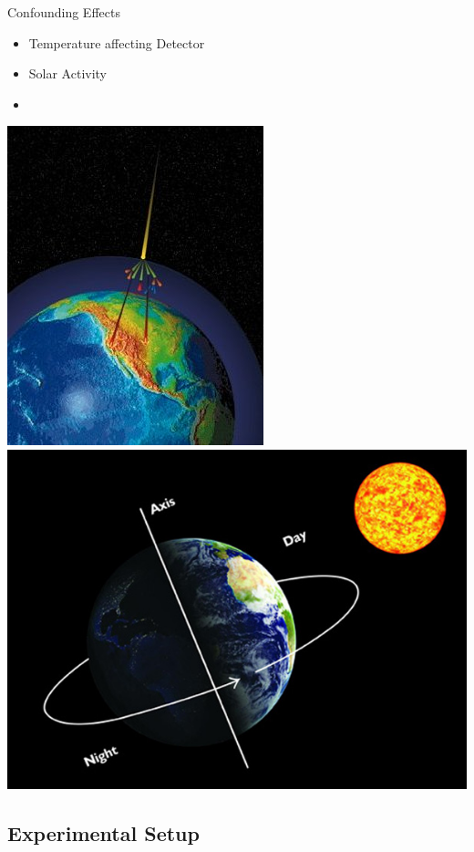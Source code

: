 \documentclass{beamer}
\begin{document}
\begin{frame}{Confounding Effects}
\begin{itemize}
	\item Temperature affecting Detector
	\item Solar Activity
	\item 
\end{itemize}
\centering
\includegraphics[scale=.4]{../Figures/crhitsearth.jpg}
\hspace{20pt}
\includegraphics[scale=.3]{../Figures/dayNight.jpg}
\end{frame}

\subsection{Experimental Setup}
\end{document}
